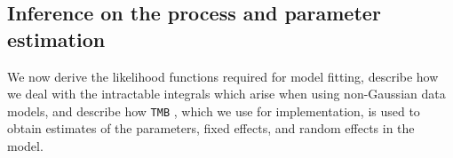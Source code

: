 \documentclass[12pt,a4paper]{article}
\begin{document}
%


\subsection{Inference on the process and parameter estimation}\label{subsection:02-03:Estimation}

We now derive the likelihood functions required for model fitting, describe how we deal with the intractable integrals which arise when using non-Gaussian data models, and describe how \texttt{TMB} \citep{Kristensen_2016_TMB}, which we use for implementation, is used to obtain estimates of the parameters, fixed effects, and random effects in the model.
\end{document}
